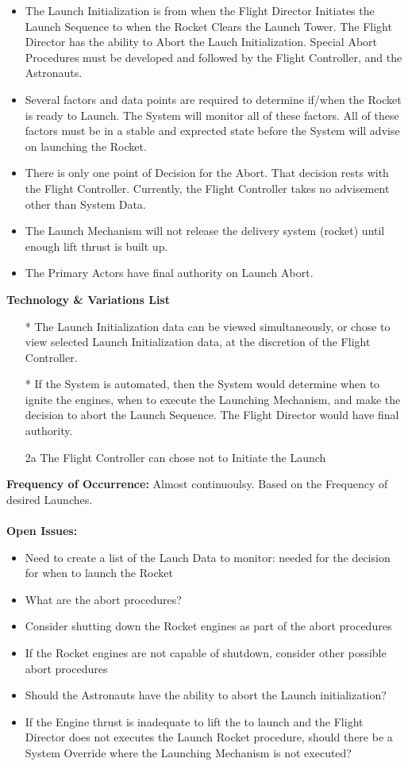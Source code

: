 \documentclass[letterpaper]{article}
\begin{document}
\begin{itemize}
\item The Launch Initialization is from when the Flight Director
Initiates the Launch Sequence to when the Rocket Clears the Launch
Tower.  The Flight Director has the ability to Abort the Lauch
Initialization.  Special Abort Procedures must be developed and
followed by the Flight Controller, and the Astronauts.
\item Several factors and data points are required to determine
if/when the Rocket is ready to Launch.  The System will monitor all
of these factors.  All of these factors must be in a stable and
exprected state before the System will advise on launching the Rocket.
\item There is only one point of Decision for the Abort.  That decision
rests with the Flight Controller.  Currently, the Flight Controller
takes no advisement other than System Data.
\item The Launch Mechanism will not release the delivery system
(rocket) until enough lift thrust is built up.
\item The Primary Actors have final authority on Launch Abort.
\end{itemize}
\textbf{Technology \& Variations List}
\begin{itemize}
\item[*] The Launch Initialization data can be viewed simultaneously,
or chose to view selected Launch Initialization data, at the discretion
of the Flight Controller.
\item[*]  If the System is automated, then the System would determine
when to ignite the engines, when  to execute the Launching
Mechanism, and make the decision to abort the Launch Sequence.  The
Flight Director would have final authority.
\item[2a]The Flight Controller can chose not to Initiate the Launch
\end{itemize}
\textbf{Frequency of Occurrence:  }Almost continuoulsy.  Based on the
Frequency of desired Launches.\\\\
\textbf{Open Issues:  }
\begin{itemize}
\item Need to create a list of the Lauch Data to monitor:  needed for
the decision for when to launch the Rocket
\item What are the abort procedures?
\item Consider shutting down the Rocket engines as part of the abort
procedures
\item If the Rocket engines are not capable of shutdown, consider
other possible abort procedures
\item Should the Astronauts have the ability to abort the Launch
initialization?
\item If the Engine thrust is inadequate to lift the to launch and
the Flight Director does not executes the Launch Rocket procedure,
should there be a System Override where the Launching Mechanism is not
executed?
\end{itemize}
\end{document}
